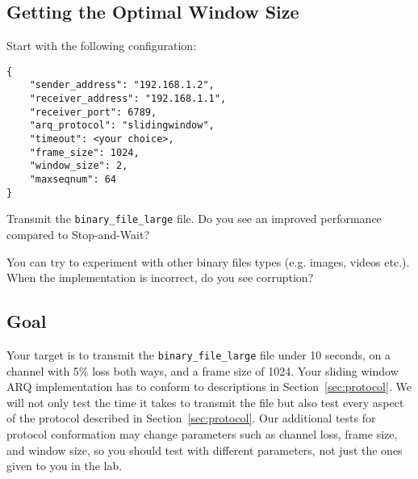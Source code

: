 \documentclass[11pt]{article}
\begin{document}

\subsection{Getting the Optimal Window Size}
Start with the following configuration:
\begin{lstlisting}[style=ece361-shell-base, caption={Sliding Window Configuration}]
{
    "sender_address": "192.168.1.2",
    "receiver_address": "192.168.1.1",
    "receiver_port": 6789,
    "arq_protocol": "slidingwindow",
    "timeout": <your choice>,
    "frame_size": 1024,
    "window_size": 2,
    "maxseqnum": 64
}
\end{lstlisting}

Transmit the \texttt{binary\_file\_large} file.
Do you see an improved performance compared to Stop-and-Wait?

You can try to experiment with other binary files types (e.g. images, videos etc.). When the implementation is incorrect, do you see corruption?

\subsection{Goal}
Your target is to transmit the \texttt{binary\_file\_large} file under 10 seconds, on a channel with 5\% loss both ways, and a frame size of 1024.
Your sliding window ARQ implementation has to conform to descriptions in Section~\ref{sec:protocol}.
We will not only test the time it takes to transmit the file but also test every aspect of the protocol described in Section~\ref{sec:protocol}.
Our additional tests for protocol conformation may change parameters such as channel loss, frame size, and window size, so you should test with different parameters, not just the ones given to you in the lab.
\end{document}

